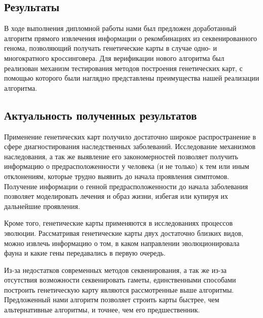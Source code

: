 \documentclass{matmex-diploma-custom}
\begin{document}
\subsection*{Результаты}

В ходе выполнения дипломной работы нами был предложен доработанный
алгоритм прямого извлечения информации о рекомбинациях из
секвенированного генома, позволяющий получать генетические карты в
случае одно- и многократного кроссинговера.  Для верификации нового
алгоритма был реализован механизм тестирования методов построения
генетических карт, с помощью которого были наглядно представлены
преимущества нашей реализации алгоритма.

\subsection*{Актуальность полученных результатов}

Применение генетических карт получило достаточно широкое
распространение в сфере диагностирования наследственных
заболеваний. Исследование механизмов наследования, а так же выявление
его закономерностей позволяет получить информацию о
предрасположенности у человека (и не только) к тем или иным
отклонениям, которые трудно выявить до начала проявления
симптомов. Получение информации о генной предрасположенности до начала
заболевания позволяет моделировать лечения и образ жизни, избегая или
купируя их дальнейшие проявления.

Кроме того, генетические карты применяются в исследованиях процессов
эволюции. Рассматривая генетические карты двух достаточно близких
видов, можно извлечь информацию о том, в каком направлении
эволюционировала фауна и какие гены передавались в первую очередь.

Из-за недостатков современных методов секвенирования, а так же из-за
отсутствия возможности секвенировать гаметы, единственными способами
построить генетическую карту являются рассмотренные выше
алгоритмы. Предложенный нами алгоритм позволяет строить карты быстрее,
чем альтернативные алгоритмы, и точнее, чем его предшественник.



\end{document}
